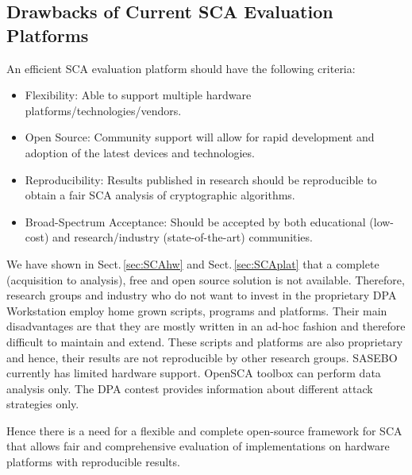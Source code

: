 \documentclass{llncs}
\numberwithin{algorithm}{chapter}
\begin{document}
\subsection{Drawbacks of Current SCA Evaluation Platforms}
An efficient SCA evaluation platform should have the following criteria:
\begin{itemize}
 \item Flexibility: Able to support multiple hardware platforms/technologies/vendors.
 \item Open Source: Community support will allow for rapid development and adoption 
       of the latest devices and technologies.
 \item Reproducibility: Results published in research should be reproducible to obtain 
       a fair SCA analysis of cryptographic algorithms.  
 \item Broad-Spectrum Acceptance: Should be accepted by both educational (low-cost) and 
       research/industry (state-of-the-art) communities.
\end{itemize}
We have shown in Sect.\,\ref{sec:SCAhw} and Sect.\,\ref{sec:SCAplat} that a complete 
(acquisition to analysis), free and open source solution is not available. 
Therefore, research groups and industry who do not want to invest in the proprietary DPA Workstation\texttrademark
employ home grown scripts, programs and platforms. Their main disadvantages are that they are mostly written
in an ad-hoc fashion and therefore difficult to maintain and extend. These scripts and platforms are also
proprietary and hence, their results are not reproducible by other research groups.
SASEBO currently has limited hardware support. OpenSCA toolbox can perform data analysis
only. The DPA contest provides information about different attack strategies only. 
 
Hence there is a need for a flexible and complete open-source framework for SCA that allows 
fair and comprehensive evaluation of implementations on hardware platforms with 
reproducible results.


\end{document}
